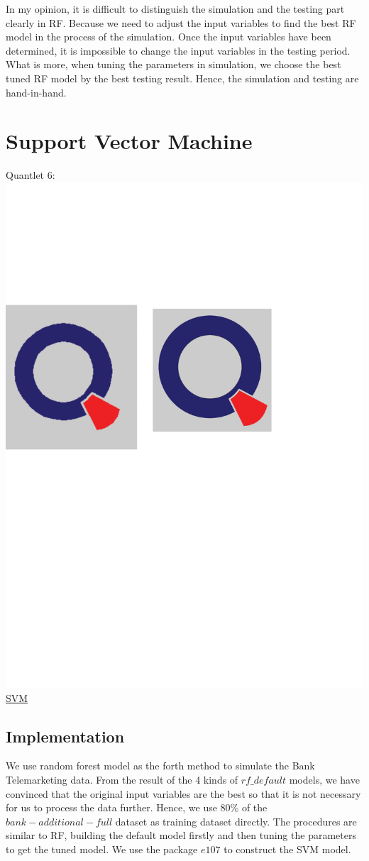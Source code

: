 \documentclass[12pt, a4paper, bibliography=totoc, english]{scrartcl}
\begin{document}
In my opinion, it is difficult to distinguish the simulation and the testing part clearly in RF. Because we need to adjust the input variables to find the best RF model in the process of the simulation. Once the input variables have been determined, it is impossible to change the input variables in the testing period. What is more, when tuning the parameters in simulation, we choose the best tuned RF model by the best testing result. Hence, the simulation and testing are hand-in-hand. 

\section{Support Vector Machine}
Quantlet 6:\includegraphics[scale=0.08]{qletlogo}
\textcolor{blue}{\href{https://github.com/JingyiLiu3136/MLFBM/tree/master/SVM}{SVM}}\\
\subsection{Implementation}
We use random forest model as the forth method to simulate the Bank Telemarketing data. From the result of the 4 kinds of $rf\_default$ models, we have convinced that the original input variables are the best so that it is not necessary for us to process the data further. Hence, we use 80\% of the $bank-additional-full$ dataset as training dataset directly. The procedures are similar to RF, building the default model firstly and then tuning the parameters to get the tuned model. We use the package $e107$ to construct the SVM model.
\end{document}

